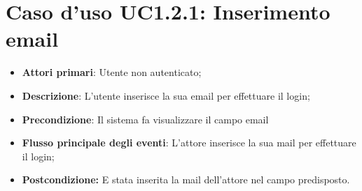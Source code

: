 \section{Caso d'uso UC1.2.1:  Inserimento email}
\begin{itemize}
	\item \textbf{Attori primari}: Utente non autenticato;
	\item \textbf{Descrizione}: L'utente inserisce la sua email per effettuare il login;
	\item \textbf{Precondizione}: Il sistema fa visualizzare il campo email
	\item \textbf{Flusso principale degli eventi}: L'attore inserisce la sua mail per effettuare il login;
	\item \textbf{Postcondizione:} E stata inserita la mail dell'attore nel campo predisposto. 
\end{itemize}
